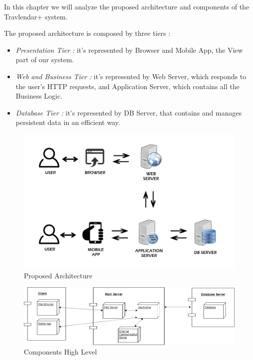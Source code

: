 \vspace*{-5mm}

In this chapter we will analyze the proposed architecture and components of the Travlendar+ system.\par
The proposed architecture is composed by three tiers :
\begin{itemize}
	\setlength{\leftskip}{0.5cm}
	\item \emph{Presentation Tier : }it's represented by Browser and Mobile App, the View part of our system.
	\item \emph{Web and Business Tier : }it's represented by Web Server, which responds to the user's HTTP requests, and Application Server, which contains all the Business Logic.
	\item \emph{Database Tier : }it's represented by DB Server, that contains and manages persistent data in an efficient way.
\end{itemize}
\begin{figure}[H]
	\centering
	\includegraphics[scale=0.35]{Images/Architecture/Proposed_Architecture}
	\caption{Proposed Architecture}
\end{figure}

\begin{figure}[H]
	\centering
	\includegraphics[scale=0.35]{Images/Architecture/Components_High_Level}
	\caption{Components High Level}
\end{figure}

